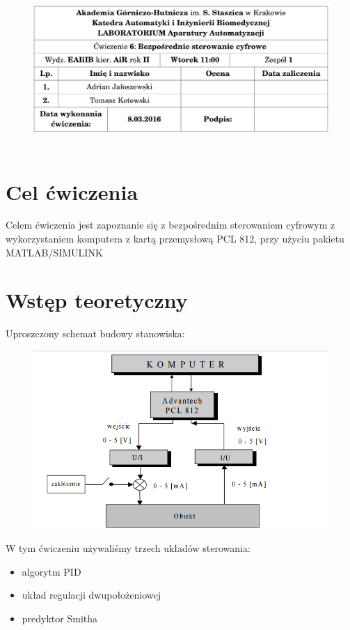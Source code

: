 \documentclass[a4paper]{article}
\begin{document}
	\begin{figure}[H]
		\centering
		\includegraphics[height=6cm, width=\textwidth]{./img/formatka.png}
	\end{figure}
	\section{Cel ćwiczenia}
		Celem ćwiczenia jest zapoznanie się z bezpośrednim sterowaniem cyfrowym z wykorzystaniem komputera z kartą przemysłową PCL 812, przy użyciu pakietu MATLAB/SIMULINK
	\section{Wstęp teoretyczny}
		Uproszczony schemat budowy stanowiska:
		\begin{figure}[H]
			\centering
			\includegraphics[width=\textwidth]{./img/schemat.png}
		\end{figure} 
		W tym ćwiczeniu używaliśmy trzech układów sterowania:
		\begin{itemize}
			\item algorytm PID
			\item układ regulacji dwupołożeniowej
			\item predyktor Smitha
		\end{itemize}
\end{document}
